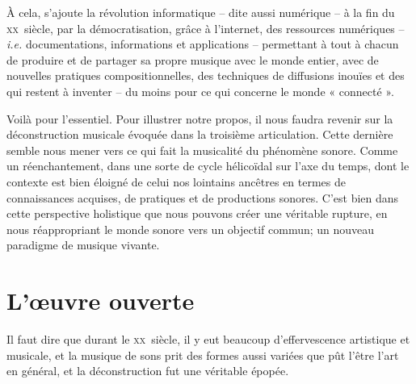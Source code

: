 \documentclass{article}
\begin{document}
À cela, s'ajoute la révolution informatique  -- dite aussi numérique --  à la fin du \textsc{xx}\ieme ~siècle,  par la démocratisation, grâce à l'internet, des ressources numériques -- \textit{i.e.} documentations, informations et applications -- permettant à tout à chacun de produire et de partager sa propre musique avec le monde entier, avec de nouvelles pratiques compositionnelles, des techniques de diffusions inouïes et des qui restent à inventer -- du moins pour ce qui concerne le monde « connecté ».


\bigskip

Voilà pour l'essentiel. Pour illustrer notre propos, il nous faudra revenir sur la déconstruction musicale évoquée dans la troisième articulation. Cette dernière semble nous mener vers ce qui fait la musicalité du phénomène sonore. Comme un réenchantement, dans une sorte de cycle hélicoïdal sur l'axe du temps, dont le contexte est bien éloigné de celui nos lointains ancêtres en termes de connaissances acquises, de pratiques et de productions sonores. C'est bien dans cette perspective holistique que nous pouvons créer une véritable rupture, en nous réappropriant le monde sonore vers un objectif commun; un nouveau paradigme de musique vivante.

\section*{L'œuvre ouverte}

Il faut dire que durant le \textsc{xx}\ieme ~siècle, il y eut beaucoup d'effervescence artistique et musicale, et la musique de sons prit des formes aussi variées que pût l'être l'art en général, et la déconstruction fut une véritable épopée.
\end{document}
